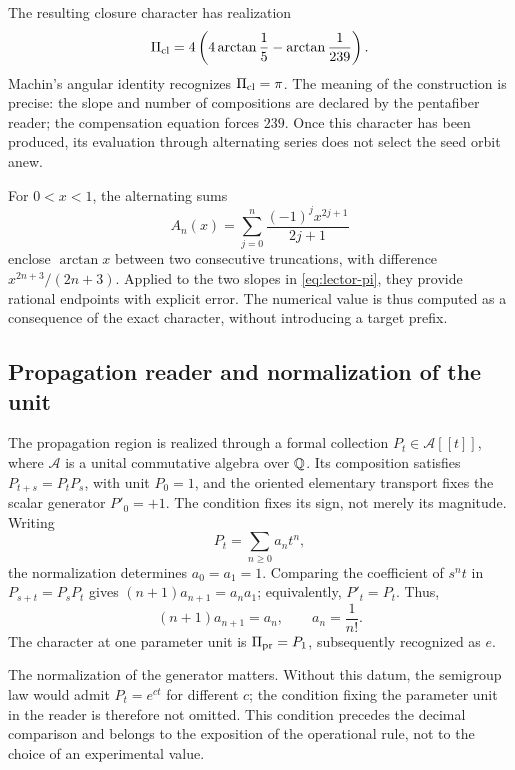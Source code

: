 The resulting closure character has realization
\begin{equation}
 \Pi_{\rm cl}=4\left(4\arctan\frac15-\arctan\frac1{239}\right).
 \label{eq:lector-pi}
\end{equation}
Machin's angular identity recognizes \(\Pi_{\rm cl}=\pi\). The meaning of the construction is precise: the slope and number of compositions are declared by the pentafiber reader; the compensation equation forces \(239\). Once this character has been produced, its evaluation through alternating series does not select the seed orbit anew.

For \(0<x<1\), the alternating sums
\[
 A_n(x)=\sum_{j=0}^n\frac{(-1)^jx^{2j+1}}{2j+1}
\]
enclose \(\arctan x\) between two consecutive truncations, with difference \(x^{2n+3}/(2n+3)\). Applied to the two slopes in \eqref{eq:lector-pi}, they provide rational endpoints with explicit error. The numerical value is thus computed as a consequence of the exact character, without introducing a target prefix.

\subsection{Propagation reader and normalization of the unit}

The propagation region is realized through a formal collection \(P_t\in\mathcal A[[t]]\), where \(\mathcal A\) is a unital commutative algebra over \(\mathbb Q\). Its composition satisfies \(P_{t+s}=P_tP_s\), with unit \(P_0=1\), and the oriented elementary transport fixes the scalar generator \(P'_0=+1\). The condition fixes its sign, not merely its magnitude. Writing
\[
 P_t=\sum_{n\ge0}a_nt^n,
\]
the normalization determines \(a_0=a_1=1\). Comparing the coefficient of \(s^nt\) in \(P_{s+t}=P_sP_t\) gives \((n+1)a_{n+1}=a_na_1\); equivalently, \(P'_t=P_t\). Thus,
\begin{equation}
 (n+1)a_{n+1}=a_n,\qquad a_n=\frac1{n!}.
 \label{eq:propagacion}
\end{equation}
The character at one parameter unit is \(\Pi_{\rm pr}=P_1\), subsequently recognized as \(e\).

The normalization of the generator matters. Without this datum, the semigroup law would admit \(P_t=e^{ct}\) for different \(c\); the condition fixing the parameter unit in the reader is therefore not omitted. This condition precedes the decimal comparison and belongs to the exposition of the operational rule, not to the choice of an experimental value.

